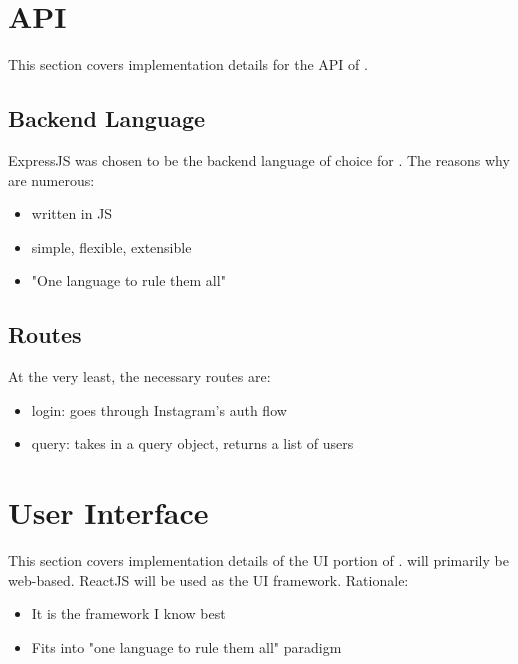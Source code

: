\section{API}
This section covers implementation details for the API of \serviceName.

\subsection{Backend Language}
ExpressJS was chosen to be the backend language of choice for \serviceName.  The reasons why are numerous:
\begin{itemize}
    \item written in JS
    \item simple, flexible, extensible
    \item "One language to rule them all"
\end{itemize}

\subsection{Routes}
At the very least, the necessary routes are:
\begin{itemize}
    \item login: goes through Instagram's auth flow
    \item query: takes in a query object, returns a list of users
\end{itemize}


\section{User Interface}
This section covers implementation details of the UI portion of \serviceName. \serviceName will primarily be web-based. ReactJS will be used as the UI framework. Rationale:
\begin{itemize}
    \item It is the framework I know best
    \item Fits into "one language to rule them all" paradigm
\end{itemize}
